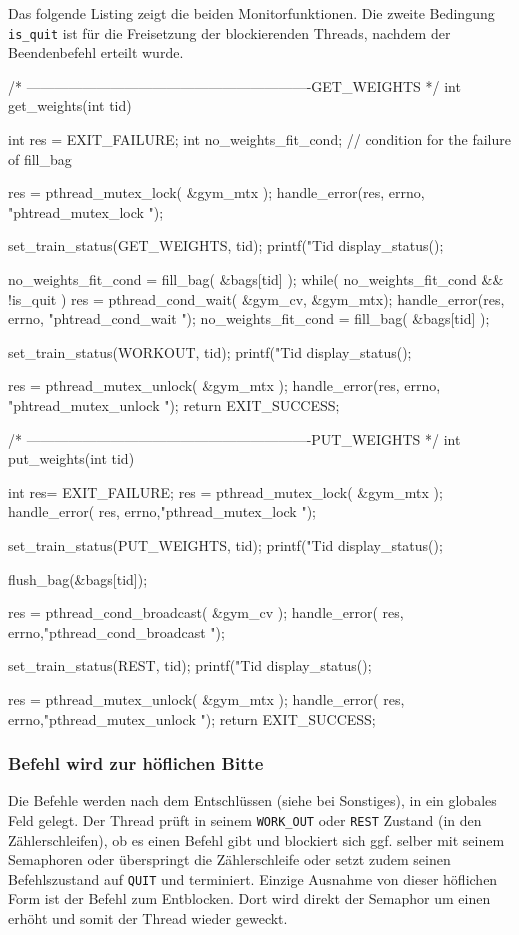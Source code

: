 \documentclass[
   draft=false
  ,paper=a4
  ,twoside=false
  ,fontsize=11pt
  ,headsepline
  ,BCOR10mm
  ,DIV11
  ,parskip=full+
]{scrartcl} %
\begin{document}
  Das folgende Listing zeigt die
  beiden Monitorfunktionen. Die zweite Bedingung \texttt{is\_quit} ist für 
  die Freisetzung der blockierenden Threads, nachdem der Beendenbefehl erteilt wurde.

  \begin{ccode}
/* -------------------------------------------------------------GET_WEIGHTS */
int get_weights(int tid){

    int res = EXIT_FAILURE;
    int no_weights_fit_cond; // condition for the failure of fill_bag

    res = pthread_mutex_lock( &gym_mtx );
    handle_error(res, errno, "phtread_mutex_lock ");

    set_train_status(GET_WEIGHTS, tid);
    printf("Tid %
    display_status();

    no_weights_fit_cond = fill_bag( &bags[tid] );
    while( no_weights_fit_cond && !is_quit ){
        res = pthread_cond_wait( &gym_cv, &gym_mtx);
        handle_error(res, errno, "phtread_cond_wait ");
        no_weights_fit_cond = fill_bag( &bags[tid] );
    }

    set_train_status(WORKOUT, tid);
    printf("Tid %
    display_status();

    res = pthread_mutex_unlock( &gym_mtx );
    handle_error(res, errno, "phtread_mutex_unlock ");
    return EXIT_SUCCESS;
}

/* -------------------------------------------------------------PUT_WEIGHTS */
int put_weights(int tid){
    int res= EXIT_FAILURE;
    res = pthread_mutex_lock( &gym_mtx );
    handle_error( res, errno,"pthread_mutex_lock ");

    set_train_status(PUT_WEIGHTS, tid);
    printf("Tid %
    display_status();

    flush_bag(&bags[tid]);

    res = pthread_cond_broadcast( &gym_cv );
    handle_error( res, errno,"pthread_cond_broadcast ");

    set_train_status(REST, tid);
    printf("Tid %
    display_status();

    res = pthread_mutex_unlock( &gym_mtx );
    handle_error( res, errno,"pthread_mutex_unlock ");
    return EXIT_SUCCESS;
}
  \end{ccode}

\subsubsection{Befehl wird zur höflichen Bitte}
  Die Befehle werden nach dem Entschlüssen (siehe bei Sonstiges), in ein
  globales Feld gelegt. Der Thread prüft in seinem \texttt{WORK\_OUT}
  oder \texttt{REST} Zustand (in den Zählerschleifen), ob es einen Befehl
  gibt und blockiert sich ggf. selber mit seinem Semaphoren oder überspringt
  die Zählerschleife oder setzt zudem seinen Befehlszustand auf \texttt{QUIT}
  und terminiert. Einzige Ausnahme von dieser höflichen Form ist der
  Befehl zum Entblocken. Dort wird direkt der Semaphor um einen erhöht und
  somit der Thread wieder geweckt.
\end{document}
